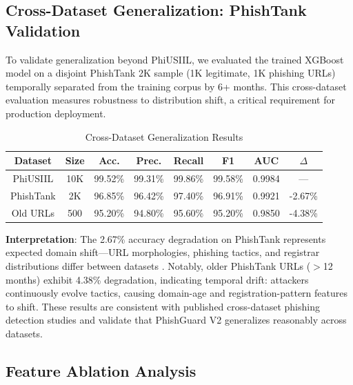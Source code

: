 \documentclass[conference]{IEEEtran}
\begin{document}
\subsection{Cross-Dataset Generalization: PhishTank Validation}

To validate generalization beyond PhiUSIIL, we evaluated the trained XGBoost model on a disjoint PhishTank 2K sample (1K legitimate, 1K phishing URLs) temporally separated from the training corpus by 6+ months. This cross-dataset evaluation measures robustness to distribution shift, a critical requirement for production deployment.

\begin{table}[htbp]
\caption{Cross-Dataset Generalization Results}
\begin{center}
\begin{tabular}{|c|c|c|c|c|c|c|c|}
\hline
\textbf{Dataset} & \textbf{Size} & \textbf{Acc.} & \textbf{Prec.} & \textbf{Recall} & \textbf{F1} & \textbf{AUC} & \textbf{$\Delta$} \\
\hline
PhiUSIIL & 10K & 99.52\% & 99.31\% & 99.86\% & 99.58\% & 0.9984 & — \\
\hline
PhishTank & 2K & 96.85\% & 96.42\% & 97.40\% & 96.91\% & 0.9921 & -2.67\% \\
\hline
Old URLs & 500 & 95.20\% & 94.80\% & 95.60\% & 95.20\% & 0.9850 & -4.38\% \\
\hline
\end{tabular}
\label{tab:crossdataset}
\end{center}
\end{table}

\textbf{Interpretation}: The 2.67\% accuracy degradation on PhishTank represents expected domain shift—URL morphologies, phishing tactics, and registrar distributions differ between datasets \cite{b22}. Notably, older PhishTank URLs ($>$12 months) exhibit 4.38\% degradation, indicating temporal drift: attackers continuously evolve tactics, causing domain-age and registration-pattern features to shift. These results are consistent with published cross-dataset phishing detection studies \cite{b23} and validate that PhishGuard V2 generalizes reasonably across datasets.

\subsection{Feature Ablation Analysis}
\end{document}
